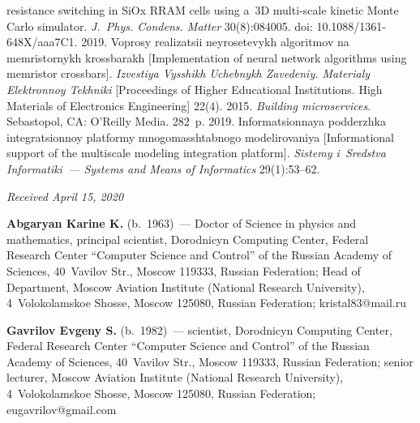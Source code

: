 \begin{multicols}{2}
{{\begin{thebibliography}{99}
resistance switching in SiOx RRAM cells using a~3D multi-scale kinetic Monte Carlo simulator. 
\textit{J.~Phys. Condens. Matter} 30(8):084005. doi: 10.1088/1361-648X/aaa7C1.
 2019. Voprosy realizatsii neyrosetevykh 
algoritmov na memristornykh krossbarakh [Implementation of neural network algorithms using memristor 
crossbars]. \textit{Izvestiya Vysshikh Uchebnykh Zavedeniy. Materialy Elektronnoy Tekhniki } [Proceedings of 
Higher Educational Institutions. High Materials of Electronics Engineering] 
22(4). %
 2015. \textit{Building microservices}. Sebastopol, CA: O'Reilly Media. 282~p.
 2019. In\-for\-ma\-tsi\-on\-naya podderzhka integratsionnoy platformy 
mnogomasshtabnogo modelirovaniya [Informational support of the multiscale modeling integration platform]. 
\textit{Sistemy i~Sredstva Informatiki~--- Systems and Means of Informatics} 29(1):53--62.
\end{thebibliography}

 }
 }

\end{multicols}

\vspace*{-6pt}

\hfill{\small\textit{Received April 15, 2020}}





\Contr

\noindent
\textbf{Abgaryan Karine K.} (b.\ 1963)~--- Doctor of Science in physics and mathematics, principal scientist, 
Dorodnicyn Computing Center, Federal Research Center ``Computer Science and Control'' of the Russian 
Academy of Sciences, 40~Vavilov Str., Moscow 119333, Russian Federation; Head of Department, Moscow 
Aviation Institute (National Research University), 4~Volokolamskoe Shosse, Moscow 125080, Russian 
Federation; \mbox{kristal83@mail.ru}

\vspace*{3pt}

\noindent
\textbf{Gavrilov Evgeny S.} (b.\ 1982)~--- scientist, Dorodnicyn Computing Center, Federal Research Center 
``Computer Science and Control'' of the Russian Academy of Sciences, 40~Vavilov Str., Moscow 119333, 
Russian Federation; senior lecturer, Moscow Aviation Institute (National Research University), 
4~Volokolamskoe Shosse, Moscow 125080, Russian Federation; \mbox{eugavrilov@gmail.com}
\label{end\stat}

\renewcommand{\bibname}{\protect\rm Литература} 